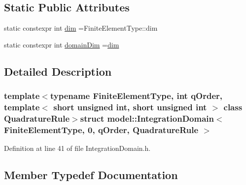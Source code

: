 \subsection*{Static Public Attributes}
\begin{DoxyCompactItemize}
\item 
static constexpr int \hyperlink{structmodel_1_1_integration_domain_3_01_finite_element_type_00_010_00_01q_order_00_01_quadrature_rule_01_4_a212a4ee1508141a0fd040c7ba09c8ca7}{dim} =Finite\+Element\+Type\+::dim
\item 
static constexpr int \hyperlink{structmodel_1_1_integration_domain_3_01_finite_element_type_00_010_00_01q_order_00_01_quadrature_rule_01_4_a6e663723cfa6cd7cff426573312390b3}{domain\+Dim} =\hyperlink{structmodel_1_1_integration_domain_3_01_finite_element_type_00_010_00_01q_order_00_01_quadrature_rule_01_4_a212a4ee1508141a0fd040c7ba09c8ca7}{dim}
\end{DoxyCompactItemize}


\subsection{Detailed Description}
\subsubsection*{template$<$typename Finite\+Element\+Type, int q\+Order, template$<$ short unsigned int, short unsigned int $>$ class Quadrature\+Rule$>$struct model\+::\+Integration\+Domain$<$ Finite\+Element\+Type, 0, q\+Order, Quadrature\+Rule $>$}



Definition at line 41 of file Integration\+Domain.\+h.



\subsection{Member Typedef Documentation}
\hypertarget{structmodel_1_1_integration_domain_3_01_finite_element_type_00_010_00_01q_order_00_01_quadrature_rule_01_4_a5e4db1863b830931b70c2862b829189f}{}
